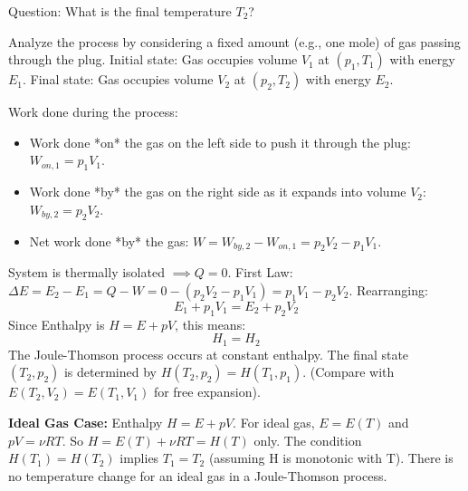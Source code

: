 \documentclass[11pt]{article}
\newcommand{\gasR}{R} %
\begin{document}
\begin{center}
\end{center}

Question: What is the final temperature $T_2$?

Analyze the process by considering a fixed amount (e.g., one mole) of gas passing through the plug.
Initial state: Gas occupies volume $V_1$ at $(p_1, T_1)$ with energy $E_1$.
Final state: Gas occupies volume $V_2$ at $(p_2, T_2)$ with energy $E_2$.

Work done during the process:
\begin{itemize}
    \item Work done *on* the gas on the left side to push it through the plug: $W_{on,1} = p_1 V_1$.
    \item Work done *by* the gas on the right side as it expands into volume $V_2$: $W_{by,2} = p_2 V_2$.
    \item Net work done *by* the gas: $W = W_{by,2} - W_{on,1} = p_2 V_2 - p_1 V_1$.
\end{itemize}
System is thermally isolated $\implies Q=0$.
First Law: $\Delta E = E_2 - E_1 = Q - W = 0 - (p_2 V_2 - p_1 V_1) = p_1 V_1 - p_2 V_2$.
Rearranging:
\[ E_1 + p_1 V_1 = E_2 + p_2 V_2 \]
Since Enthalpy is $H = E + pV$, this means:
\[ H_1 = H_2 \]
The Joule-Thomson process occurs at constant enthalpy. The final state $(T_2, p_2)$ is determined by $H(T_2, p_2) = H(T_1, p_1)$. (Compare with $E(T_2, V_2) = E(T_1, V_1)$ for free expansion).

\textbf{Ideal Gas Case:}
Enthalpy $H = E + pV$. For ideal gas, $E=E(T)$ and $pV=\nu \gasR T$.
So $H = E(T) + \nu \gasR T = H(T)$ only.
The condition $H(T_1) = H(T_2)$ implies $T_1 = T_2$ (assuming H is monotonic with T).
There is no temperature change for an ideal gas in a Joule-Thomson process.
\end{document}
